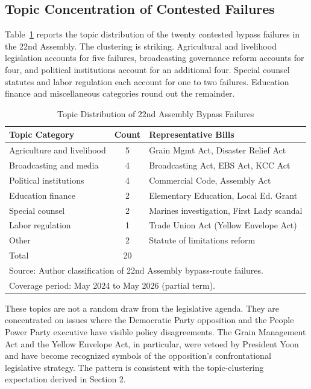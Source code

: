 \documentclass[11pt]{article}
\begin{document}
\subsection{Topic Concentration of Contested Failures}

Table~\ref{tab:topics} reports the topic distribution of the twenty contested bypass failures in the 22nd Assembly. The clustering is striking. Agricultural and livelihood legislation accounts for five failures, broadcasting governance reform accounts for four, and political institutions account for an additional four. Special counsel statutes and labor regulation each account for one to two failures. Education finance and miscellaneous categories round out the remainder.

\begin{table}[H]
\centering
\caption{Topic Distribution of 22nd Assembly Bypass Failures}
\label{tab:topics}
\begin{tabular}{lcl}
\toprule
Topic Category & Count & Representative Bills \\
\midrule
Agriculture and livelihood & 5 & Grain Mgmt Act, Disaster Relief Act \\
Broadcasting and media & 4 & Broadcasting Act, EBS Act, KCC Act \\
Political institutions & 4 & Commercial Code, Assembly Act \\
Education finance & 2 & Elementary Education, Local Ed. Grant \\
Special counsel & 2 & Marines investigation, First Lady scandal \\
Labor regulation & 1 & Trade Union Act (Yellow Envelope Act) \\
Other & 2 & Statute of limitations reform \\
\midrule
Total & 20 & \\
\bottomrule
\multicolumn{3}{l}{\footnotesize Source: Author classification of 22nd Assembly bypass-route failures.} \\
\multicolumn{3}{l}{\footnotesize Coverage period: May 2024 to May 2026 (partial term).} \\
\end{tabular}
\end{table}

These topics are not a random draw from the legislative agenda. They are concentrated on issues where the Democratic Party opposition and the People Power Party executive have visible policy disagreements. The Grain Management Act and the Yellow Envelope Act, in particular, were vetoed by President Yoon and have become recognized symbols of the opposition's confrontational legislative strategy. The pattern is consistent with the topic-clustering expectation derived in Section 2.
\end{document}
